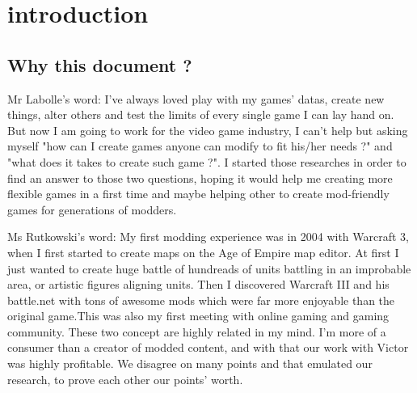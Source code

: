 \documentclass[a4paper,11pt]{article}
\begin{document}
\thispagestyle{empty}
\sffamily


\newpage
{}
\newpage


\section{introduction}

\subsection{Why this document ?}

Mr Labolle’s word:
I've always loved play with my games' datas, create new things, alter others and test the limits of every single game I can lay hand on. But now I am going to work for the video game industry, I can't help but asking myself "how can I create games anyone can modify to fit his/her needs ?" and "what does it takes to create such game ?". I started those researches in order to find an answer to those two questions, hoping it would help me creating more flexible games in a first time and maybe helping other to create mod-friendly games for generations of modders.

Ms Rutkowski’s word:
My first modding experience was in 2004 with Warcraft 3, when I first started to create maps on the Age of Empire map editor. At first I just wanted to create huge battle of hundreads of units battling in an improbable area, or artistic figures aligning units. Then I discovered Warcraft III and his battle.net with tons of awesome mods which were far more enjoyable than the original game.This was also my first meeting with online gaming and gaming community. These two concept are highly related in my mind. I’m more of a consumer than a creator of modded content, and with that our work with Victor was highly profitable. We disagree on many points and that emulated our research, to prove each other our points’ worth.
\end{document}
